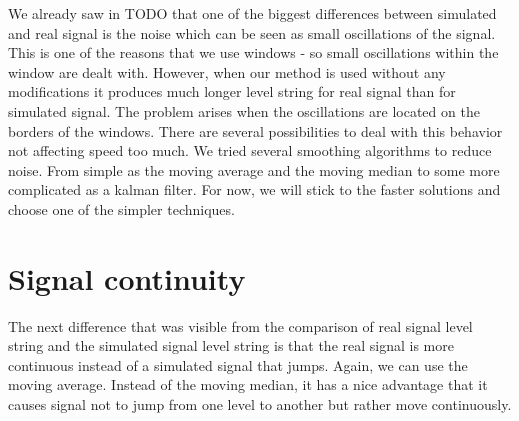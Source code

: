 We already saw in TODO that one of the biggest differences between simulated and
real signal is the noise which can be seen as small oscillations of the signal. This is
one of the reasons that we use windows - so small oscillations within the window
are dealt with. However, when our method is used without any modifications it
produces much longer level string for real signal than for simulated signal.
The problem arises when the oscillations are located on the borders of the windows.
There are several possibilities to deal with this behavior not affecting speed too
much. We tried several smoothing algorithms to reduce noise. From simple as the
moving average and the moving median to some more complicated as a kalman filter.
For now, we will stick to the faster solutions and choose one of the simpler techniques.

\section{Signal continuity}

The next difference that was visible from the comparison of real signal level string
and the simulated signal level string is that the real signal is more continuous instead
of a simulated signal that jumps. Again, we can use the moving average. Instead of
the moving median, it has a nice advantage that it causes signal not to jump from
one level to another but rather move continuously.
